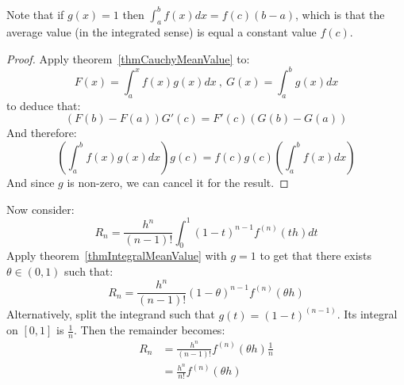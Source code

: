 \documentclass[../Main.tex]{subfiles}
\begin{document}
\begin{remark}
    Note that if $g(x) = 1$ then $\int_a^b f(x) dx = f(c)(b - a)$, which is that the average value (in the integrated sense) is equal a constant value $f(c)$.
\end{remark}
\begin{proof}
    Apply theorem~\ref{thmCauchyMeanValue} to:
    \begin{equation*}
        F(x) = \int_a^x f(x) g(x) dx~,~G(x) = \int_a^b g(x) dx
    \end{equation*}
    to deduce that:
    \begin{equation*}
        (F(b) - F(a))G'(c) = F'(c)(G(b) - G(a))
    \end{equation*}
    And therefore:
    \begin{equation*}
        \left(\int_a^b f(x) g(x) dx\right)g(c) = f(c) g(c) \left(\int_a^b f(x) dx\right)
    \end{equation*}
    And since $g$ is non-zero, we can cancel it for the result.
\end{proof}
Now consider:
\begin{equation*}
    R_n = \frac{h^n}{(n-1)!}\int_0^1 (1 - t)^{n-1} f^{(n)}(th) dt
\end{equation*}
Apply theorem~\ref{thmIntegralMeanValue} with $g = 1$ to get that there exists $\theta \in (0, 1)$ such that:
\begin{equation*}
    R_n = \frac{h^n}{(n-1)!}(1 - \theta)^{n-1} f^{(n)}(\theta h)
\end{equation*}
Alternatively, split the integrand such that $g(t) = (1 - t)^{(n-1)}$. Its integral on $[0, 1]$ is $\frac{1}{n}$.
Then the remainder becomes:
\begin{align*}
    R_n &= \frac{h^n}{(n-1)!}f^{(n)}(\theta h) \frac{1}{n} \\
    &= \frac{h^n}{n!}f^{(n)}(\theta h)
\end{align*}
\end{document}
